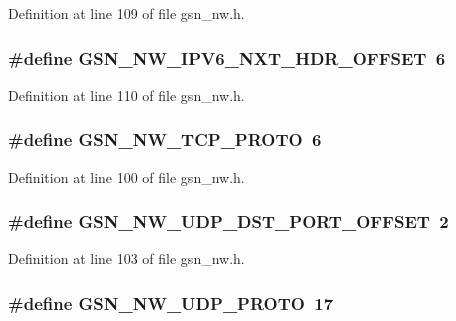 Definition at line 109 of file gsn\_\-nw.h.

\hypertarget{a00532_a0a016de722e22e498dadfba1abaa4bc3}{
\subsubsection[{GSN\_\-NW\_\-IPV6\_\-NXT\_\-HDR\_\-OFFSET}]{\setlength{\rightskip}{0pt plus 5cm}\#define GSN\_\-NW\_\-IPV6\_\-NXT\_\-HDR\_\-OFFSET~6}}
\label{a00532_a0a016de722e22e498dadfba1abaa4bc3}


Definition at line 110 of file gsn\_\-nw.h.

\hypertarget{a00532_afe27d1a9e2891e6939362b0ad9ea8430}{
\subsubsection[{GSN\_\-NW\_\-TCP\_\-PROTO}]{\setlength{\rightskip}{0pt plus 5cm}\#define GSN\_\-NW\_\-TCP\_\-PROTO~6}}
\label{a00532_afe27d1a9e2891e6939362b0ad9ea8430}


Definition at line 100 of file gsn\_\-nw.h.

\hypertarget{a00532_aff1de9469dd7dfe4602cf6f1ec811fc1}{
\subsubsection[{GSN\_\-NW\_\-UDP\_\-DST\_\-PORT\_\-OFFSET}]{\setlength{\rightskip}{0pt plus 5cm}\#define GSN\_\-NW\_\-UDP\_\-DST\_\-PORT\_\-OFFSET~2}}
\label{a00532_aff1de9469dd7dfe4602cf6f1ec811fc1}


Definition at line 103 of file gsn\_\-nw.h.

\hypertarget{a00532_a71538a17a95630ca5c9571eafc64e3f2}{
\subsubsection[{GSN\_\-NW\_\-UDP\_\-PROTO}]{\setlength{\rightskip}{0pt plus 5cm}\#define GSN\_\-NW\_\-UDP\_\-PROTO~17}}
\label{a00532_a71538a17a95630ca5c9571eafc64e3f2}



